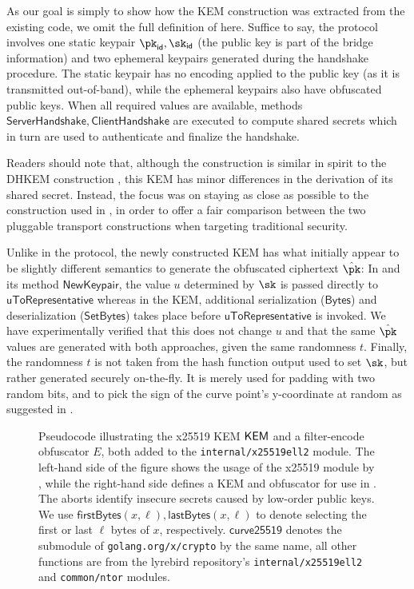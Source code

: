 As our goal is simply to show how the KEM construction was extracted from the existing code, we omit the full definition of \obfsfour{} here. Suffice to say, the protocol involves one static keypair $\pk_\mathsf{id}, \sk_\mathsf{id}$ (the public key is part of the bridge information) and two ephemeral keypairs generated during the handshake procedure. The static keypair has no encoding applied to the public key (as it is transmitted out-of-band), while the ephemeral keypairs also have obfuscated public keys. When all required values are available, methods $\mathsf{ServerHandshake}, \mathsf{ClientHandshake}$ are executed to compute shared secrets which in turn are used to authenticate and finalize the handshake.

Readers should note that, although the construction is similar in spirit to the DHKEM construction \cite[Section~4.1]{rfc9180}, this KEM has minor differences in the derivation of its shared secret. Instead, the focus was on staying as close as possible to the construction used in \obfsfour{}, in order to offer a fair comparison between the two pluggable transport constructions when targeting traditional security.

Unlike in the \obfsfour{} protocol, the newly constructed KEM has what initially appear to be slightly different semantics to generate the obfuscated ciphertext $\hat \pk$:
In \obfsfour{} and its method $\mathsf{NewKeypair}$, the value $u$ determined by $\sk$ is passed directly to $\mathsf{uToRepresentative}$ whereas in the KEM, additional serialization ($\mathsf{Bytes}$) and deserialization ($\mathsf{SetBytes}$) takes place before $\mathsf{uToRepresentative}$ is invoked.
We have experimentally verified that this does not change $u$ and that the same $\hat \pk$ values are generated with both approaches, given the same randomness $t$.
Finally, the randomness $t$ is not taken from the hash function output used to set $\sk$, but rather generated securely on-the-fly. It is merely used for padding with two random bits, and to pick the sign of the curve point's y-coordinate at random as suggested in \cite{elligatorExplicitFormulas}.

\begin{figure}
    
    \caption[
        Pseudocode illustrating the x25519 KEM and filter-encode obfuscator added to the \texttt{internal/x25519ell2} module.
    ]{
        Pseudocode illustrating the x25519 KEM $\mathsf{KEM}$ and a filter-encode obfuscator $E$, both added to the \texttt{internal/x25519ell2} module.
        The left-hand side of the figure shows the usage of the x25519 module by \obfsfour{}, while the right-hand side defines a KEM and obfuscator for use in \drivel{}.
        The aborts identify insecure secrets caused by low-order public keys.
        We use $\mathsf{firstBytes}(x, \ell), \mathsf{lastBytes}(x, \ell)$ to denote selecting the first or last $\ell$ bytes of $x$, respectively.
        $\mathsf{curve25519}$ denotes the submodule of \texttt{golang.org/x/crypto} by the same name, all other functions are from the lyrebird repository's \texttt{internal/x25519ell2} and \texttt{common/ntor} modules.
    }
    \label{fig:impl-x25519-kem}
\end{figure}

